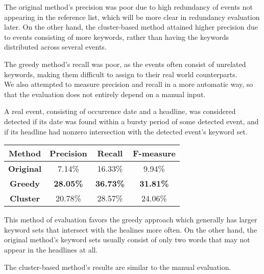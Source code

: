 \hspace{\fill}

The original method's precision was poor due to high redundancy of events not appearing in the reference list, which will be more clear in redundancy evaluation later. On the other hand, the cluster-based method attained higher precision due to events consisting of more keywords, rather than having the keywords distributed across several events.

The greedy method's recall was poor, as the events often consist of unrelated keywords, making them difficult to assign to their real world counterparts.\\

We also attempted to measure precision and recall in a more automatic way, so that the evaluation does not entirely depend on a manual input.

A real event, consisting of occurrence date and a headline, was considered detected if its date was found within a bursty period of some detected event, and if its headline had nonzero intersection with the detected event's keyword set.

\hspace{\fill}

\begin{minipage}{\linewidth}
\centering
\begin{tabular}{ c c c c }\toprule[1.5pt]
\bf Method 	 & \bf Precision & \bf Recall & \bf F-measure \\ \midrule
\bf Original &  7.14\%     & 16.33\%     &  9.94\% \\
\bf Greedy   &  \bf 28.05\%     & \bf 36.73\%      &  \bf 31.81\% \\
\bf Cluster &  20.78\%     & 28.57\%      &  24.06\% \\ \bottomrule[1.25pt]
\end {tabular}\par
{} \label{tab:title} 
\end{minipage}

\hspace{\fill}

This method of evaluation favors the greedy approach which generally has larger keyword sets that intersect with the healines more often. On the other hand, the original method's keyword sets usually consist of only two words that may not appear in the headlines at all.

The cluster-based method's results are similar to the manual evaluation.

